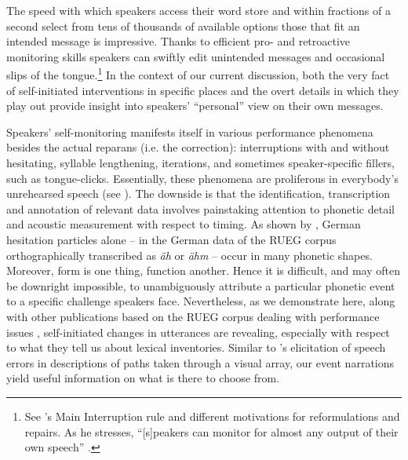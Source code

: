 \documentclass[output=paper,colorlinks,citecolor=brown]{langscibook}
\begin{document}
The speed with which speakers access their word store and within fractions of a second select from tens of thousands of available options those that fit an intended message is impressive. Thanks to efficient pro- and retroactive monitoring skills speakers can swiftly edit unintended messages and occasional slips of the tongue.\footnote{See \citet{Levelt1989Speaking}'s Main Interruption rule and different motivations for reformulations and repairs. As he stresses, ``[s]peakers can monitor for almost any output of their own speech'' \citep[436]{Levelt1989Speaking}.} In the context of our current discussion, both the very fact of self-initiated interventions in specific places and the overt details in which they play out provide insight into speakers' ``personal'' view on their own messages.

Speakers' self-monitoring manifests itself in various performance phenomena besides the actual reparans (i.e. the correction): interruptions with and without hesitating, syllable lengthening, iterations, and sometimes speaker-specific fillers, such as tongue-clicks. Essentially, these phenomena are proliferous in everybody’s unrehearsed speech (see \citealt{Fromkin1973Speech, HiekeCowallOConnell1983Trouble, Levelt1989Speaking,Clark2002Using, Belz2023filler}). 
The downside is that the identification, transcription and annotation of relevant data involves painstaking attention to phonetic detail and acoustic measurement with respect to timing. As shown by \citet{Belz2021Phonetik}, German hesitation particles alone – in the German data of the RUEG corpus orthographically transcribed as \textit{äh} or \textit{ähm} – occur in many phonetic shapes. Moreover, form is one thing, function another. Hence it is difficult, and may often be downright impossible, to unambiguously attribute a particular phonetic event to a specific challenge speakers face. Nevertheless, as we demonstrate here, along with other publications based on the RUEG corpus dealing with performance issues \citep{BoettcherZellers2023, TracyGibbon2023Timing}, self-initiated changes in utterances are revealing, especially with respect to what they tell us about lexical inventories. Similar to \citet{Levelt1989Speaking}'s elicitation of speech errors in descriptions of paths taken through a visual array, our event narrations yield useful information on what is there to choose from.
\end{document}
